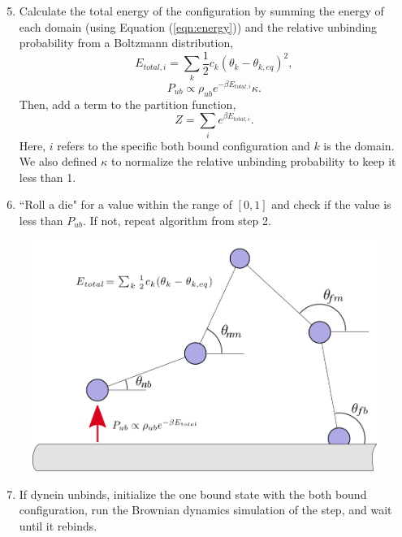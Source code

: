 \begin{enumerate}
	\setcounter{enumi}{4}
	\item Calculate the total energy of the configuration by summing the energy of each domain (using Equation (\ref{eqn:energy})) and the relative unbinding probability from a Boltzmann distribution,
	\begin{equation}
		E_{total, i}=\sum_{k}\frac{1}{2}c_k(\theta_k-\theta_{k,eq})^2,
	\end{equation}
	\begin{equation}
		P_{ub} \propto \rho_{ub}e^{-\beta E_{total, i}}\kappa.
	\end{equation}
	Then, add a term to the partition function,
	\begin{equation}
		Z=\sum_{i}e^{\beta E_{total, i}}.
	\end{equation}
	Here, $i$ refers to the specific both bound configuration and $k$ is the domain. We also defined $\kappa$ to normalize the relative unbinding probability to keep it less than 1. 
	
	\item ``Roll a die" for a value within the range of $[0,1]$ and check if the value is less than $P_{ub}$. If not, repeat algorithm from step 2.
\end{enumerate}

\begin{figure}[H]
\centering
\includegraphics[width=0.8\columnwidth]{Figures/montecarlo4.png}
\label{fig:mc4}
\end{figure}

\newpage

\begin{enumerate}
	\setcounter{enumi}{6}
	\item If dynein unbinds, initialize the one bound state with the both bound configuration, run the Brownian dynamics simulation of the step, and wait until it rebinds.
\end{enumerate}

